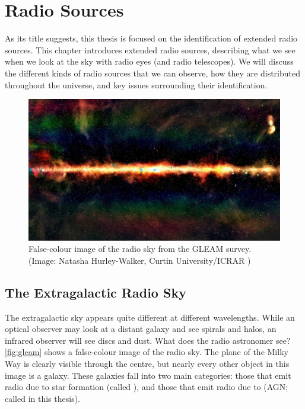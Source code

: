 \chapter{Radio Sources}
\label{cha:background}

    As its title suggests, this thesis is focused on the identification of extended radio sources. This chapter introduces extended radio sources, describing what we see when we look at the sky with radio eyes (and radio telescopes). We will discuss the different kinds of radio sources that we can observe, how they are distributed throughout the universe, and key issues surrounding their identification.

    \begin{figure}[ht]
        \includegraphics[width=\textwidth]{images/gleam.jpg}
        \caption[False-colour image of the radio sky from the GLEAM survey.]{\label{fig:gleam} False-colour image of the radio sky from the GLEAM survey. (Image: Natasha Hurley-Walker, Curtin University/ICRAR \citeneeded)}
    \end{figure}

\section{The Extragalactic Radio Sky}
\label{sec:extragalactic-radio-sky}

    The extragalactic sky appears quite different at different wavelengths. While an optical observer may look at a distant galaxy and see spirals and halos, an infrared observer will see discs and dust. What does the radio astronomer see? 
    \autoref{fig:gleam} shows a false-colour image of the radio sky. The plane of the Milky Way is clearly visible through the centre, but nearly every other object in this image is a galaxy. These galaxies fall into two main categories: those that emit radio due to star formation (called ), and those that emit radio due to  (AGN; called  in this thesis).

